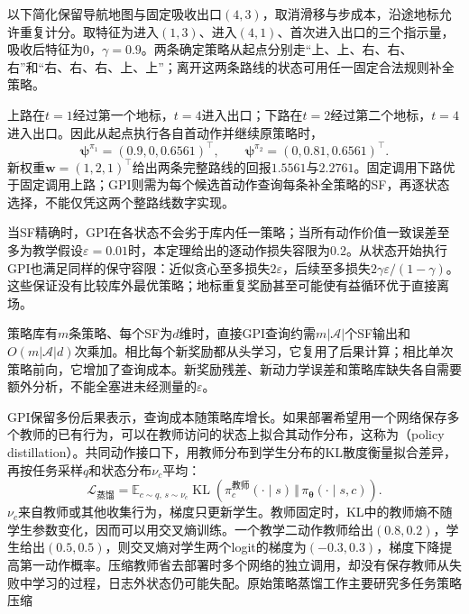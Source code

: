 \begin{example}[两条绕障策略的新奖励评价]
 \label{ex:rl-transfer-sf-routes}
 以下简化保留导航地图与固定吸收出口$(4,3)$，取消滑移与步成本，沿途地标允许重复计分。取特征为进入$(1,3)$、进入$(4,1)$、首次进入出口的三个指示量，吸收后特征为0，$\gamma=0.9$。两条确定策略从起点分别走“上、上、右、右、右”和“右、右、右、上、上”；离开这两条路线的状态可用任一固定合法规则补全策略。

 上路在$t=1$经过第一个地标，$t=4$进入出口；下路在$t=2$经过第二个地标，$t=4$进入出口。因此从起点执行各自首动作并继续原策略时，
 \[
 \bm\psi^{\pi_1}=(0.9,0,0.6561)^\top,\qquad
 \bm\psi^{\pi_2}=(0,0.81,0.6561)^\top.
 \]
 新权重$\bm w=(1,2,1)^\top$给出两条完整路线的回报$1.5561$与$2.2761$。固定调用下路优于固定调用上路；GPI则需为每个候选首动作查询每条补全策略的SF，再逐状态选择，不能仅凭这两个整路线数字实现。

 当SF精确时，GPI在各状态不会劣于库内任一策略；当所有动作价值一致误差至多为教学假设$\varepsilon=0.01$时，本定理给出的逐动作损失容限为$0.2$。从状态开始执行GPI也满足同样的保守容限：近似贪心至多损失$2\varepsilon$，后续至多损失$2\gamma\varepsilon/(1-\gamma)$。这些保证没有比较库外最优策略；地标重复奖励甚至可能使有益循环优于直接离场。
\end{example}

策略库有$m$条策略、每个SF为$d$维时，直接GPI查询约需$m|\mathcal A|$个SF输出和$O(m|\mathcal A|d)$次乘加。相比每个新奖励都从头学习，它复用了后果计算；相比单次策略前向，它增加了查询成本。新奖励残差、新动力学误差和策略库缺失各自需要额外分析，不能全塞进未经测量的$\varepsilon$。

GPI保留多份后果表示，查询成本随策略库增长。如果部署希望用一个网络保存多个教师的已有行为，可以在教师访问的状态上拟合其动作分布，这称为（policy distillation）。共同动作接口下，用教师分布到学生分布的KL散度衡量拟合差异，再按任务采样$q$和状态分布$\nu_c$平均：
\[
 \mathcal L_{\text{蒸馏}}=
 \mathbb E_{c\sim q,\,s\sim\nu_c}
 \operatorname{KL}\!\left(\pi_c^{\text{教师}}(\cdot\mid s)
       \,\Vert\,\pi_{\bm\theta}(\cdot\mid s,c)\right).
\]
$\nu_c$来自教师或其他收集行为，梯度只更新学生。教师固定时，KL中的教师熵不随学生参数变化，因而可以用交叉熵训练。一个教学二动作教师给出$(0.8,0.2)$，学生给出$(0.5,0.5)$，则交叉熵对学生两个logit的梯度为$(-0.3,0.3)$，梯度下降提高第一动作概率。压缩教师省去部署时多个网络的独立调用，却没有保存教师从失败中学习的过程，日志外状态仍可能失配。原始策略蒸馏工作主要研究多任务策略压缩

